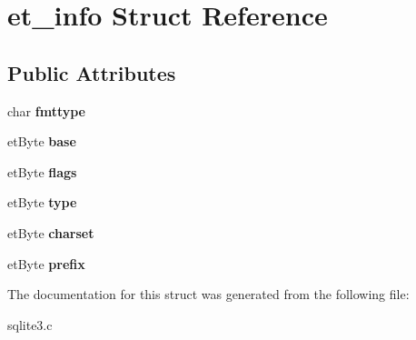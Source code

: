 \hypertarget{structet__info}{}\section{et\+\_\+info Struct Reference}
\label{structet__info}
\subsection*{Public Attributes}
\begin{DoxyCompactItemize}
\item 
char {\bfseries fmttype}\hypertarget{structet__info_a1740af27f0c9d5840e7dda59a129aa4b}{}\label{structet__info_a1740af27f0c9d5840e7dda59a129aa4b}

\item 
et\+Byte {\bfseries base}\hypertarget{structet__info_a20f5a4c11c7aa1d9c777805d11965c66}{}\label{structet__info_a20f5a4c11c7aa1d9c777805d11965c66}

\item 
et\+Byte {\bfseries flags}\hypertarget{structet__info_a8f11646aaec803f0870683dc3ba2f756}{}\label{structet__info_a8f11646aaec803f0870683dc3ba2f756}

\item 
et\+Byte {\bfseries type}\hypertarget{structet__info_a148bd1efa49018c9a723701ba5747825}{}\label{structet__info_a148bd1efa49018c9a723701ba5747825}

\item 
et\+Byte {\bfseries charset}\hypertarget{structet__info_a77131acb7479b0e6aad61af0901e11c2}{}\label{structet__info_a77131acb7479b0e6aad61af0901e11c2}

\item 
et\+Byte {\bfseries prefix}\hypertarget{structet__info_a23cc866bf202c34e49bd49599b051628}{}\label{structet__info_a23cc866bf202c34e49bd49599b051628}

\end{DoxyCompactItemize}


The documentation for this struct was generated from the following file\+:\begin{DoxyCompactItemize}
\item 
sqlite3.\+c\end{DoxyCompactItemize}
